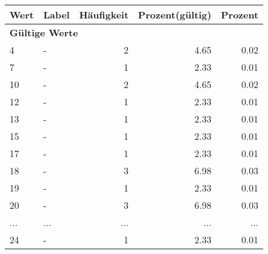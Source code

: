      \begin{longtable}{lXrrr}
     \toprule
     \textbf{Wert} & \textbf{Label} & \textbf{Häufigkeit} & \textbf{Prozent(gültig)} & \textbf{Prozent} \\
     \endhead
     \midrule
     \multicolumn{5}{l}{\textbf{Gültige Werte}}\\
        4 & \multicolumn{1}{X}{-} & %
          \num{2} &
          \num[round-mode=places,round-precision=2]{4.65} &
          \num[round-mode=places,round-precision=2]{0.02} \\
        7 & \multicolumn{1}{X}{-} & %
          \num{1} &
          \num[round-mode=places,round-precision=2]{2.33} &
          \num[round-mode=places,round-precision=2]{0.01} \\
        10 & \multicolumn{1}{X}{-} & %
          \num{2} &
          \num[round-mode=places,round-precision=2]{4.65} &
          \num[round-mode=places,round-precision=2]{0.02} \\
        12 & \multicolumn{1}{X}{-} & %
          \num{1} &
          \num[round-mode=places,round-precision=2]{2.33} &
          \num[round-mode=places,round-precision=2]{0.01} \\
        13 & \multicolumn{1}{X}{-} & %
          \num{1} &
          \num[round-mode=places,round-precision=2]{2.33} &
          \num[round-mode=places,round-precision=2]{0.01} \\
        15 & \multicolumn{1}{X}{-} & %
          \num{1} &
          \num[round-mode=places,round-precision=2]{2.33} &
          \num[round-mode=places,round-precision=2]{0.01} \\
        17 & \multicolumn{1}{X}{-} & %
          \num{1} &
          \num[round-mode=places,round-precision=2]{2.33} &
          \num[round-mode=places,round-precision=2]{0.01} \\
        18 & \multicolumn{1}{X}{-} & %
          \num{3} &
          \num[round-mode=places,round-precision=2]{6.98} &
          \num[round-mode=places,round-precision=2]{0.03} \\
        19 & \multicolumn{1}{X}{-} & %
          \num{1} &
          \num[round-mode=places,round-precision=2]{2.33} &
          \num[round-mode=places,round-precision=2]{0.01} \\
        20 & \multicolumn{1}{X}{-} & %
          \num{3} &
          \num[round-mode=places,round-precision=2]{6.98} &
          \num[round-mode=places,round-precision=2]{0.03} \\
       ... & ... & ... & ... & ... \\
        24 & \multicolumn{1}{X}{-} & %
          \num{1} &
          \num[round-mode=places,round-precision=2]{2.33} &
          \num[round-mode=places,round-precision=2]{0.01} \\


\end{longtable}
